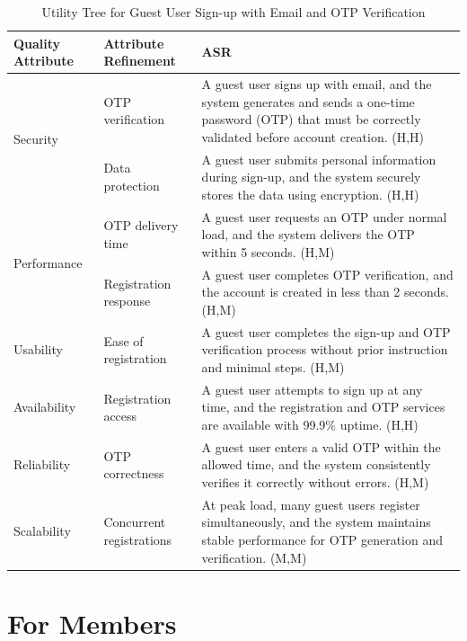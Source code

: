 \documentclass{article}
\begin{document}
\begin{table}[H]
\centering
\caption{Utility Tree for Guest User Sign-up with Email and OTP Verification}
\begin{tabular}{|p{3cm}|p{4cm}|p{7cm}|}
\hline
\textbf{Quality Attribute} & \textbf{Attribute Refinement} & \textbf{ASR} \\
\hline

\multirow{2}{*}{Security}
& OTP verification
& A guest user signs up with email, and the system generates and sends a one-time password (OTP) that must be correctly validated before account creation. (H,H) \\
\cline{2-3}
& Data protection
& A guest user submits personal information during sign-up, and the system securely stores the data using encryption. (H,H) \\
\hline

\multirow{2}{*}{Performance}
& OTP delivery time
& A guest user requests an OTP under normal load, and the system delivers the OTP within 5 seconds. (H,M) \\
\cline{2-3}
& Registration response
& A guest user completes OTP verification, and the account is created in less than 2 seconds. (H,M) \\
\hline

Usability
& Ease of registration
& A guest user completes the sign-up and OTP verification process without prior instruction and minimal steps. (H,M) \\
\hline

Availability
& Registration access
& A guest user attempts to sign up at any time, and the registration and OTP services are available with 99.9\% uptime. (H,H) \\
\hline

Reliability
& OTP correctness
& A guest user enters a valid OTP within the allowed time, and the system consistently verifies it correctly without errors. (H,M) \\
\hline

Scalability
& Concurrent registrations
& At peak load, many guest users register simultaneously, and the system maintains stable performance for OTP generation and verification. (M,M) \\
\hline

\end{tabular}
\end{table}

\section{For Members}
\end{document}
